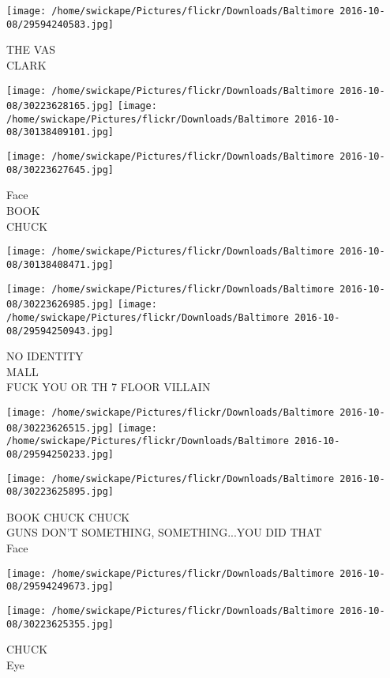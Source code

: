 \documentclass[10pt,letterpaper]{article}
\begin{document}
\vspace{0.25in}
\texttt{[image: /home/swickape/Pictures/flickr/Downloads/Baltimore 2016-10-08/29594240583.jpg]}

THE VAS\\
CLARK
\pagebreak

\texttt{[image: /home/swickape/Pictures/flickr/Downloads/Baltimore 2016-10-08/30223628165.jpg]}
\texttt{[image: /home/swickape/Pictures/flickr/Downloads/Baltimore 2016-10-08/30138409101.jpg]}

\texttt{[image: /home/swickape/Pictures/flickr/Downloads/Baltimore 2016-10-08/30223627645.jpg]}

Face\\
BOOK\\
CHUCK
\pagebreak

\texttt{[image: /home/swickape/Pictures/flickr/Downloads/Baltimore 2016-10-08/30138408471.jpg]}

\vspace{0.25in}
\texttt{[image: /home/swickape/Pictures/flickr/Downloads/Baltimore 2016-10-08/30223626985.jpg]}
\texttt{[image: /home/swickape/Pictures/flickr/Downloads/Baltimore 2016-10-08/29594250943.jpg]}

NO IDENTITY\\
MALL\\
FUCK YOU OR TH 7 FLOOR VILLAIN
\pagebreak

\texttt{[image: /home/swickape/Pictures/flickr/Downloads/Baltimore 2016-10-08/30223626515.jpg]}
\texttt{[image: /home/swickape/Pictures/flickr/Downloads/Baltimore 2016-10-08/29594250233.jpg]}

\vspace{0.25in}
\texttt{[image: /home/swickape/Pictures/flickr/Downloads/Baltimore 2016-10-08/30223625895.jpg]}

BOOK CHUCK CHUCK\\
GUNS DON'T SOMETHING, SOMETHING...YOU DID THAT\\
Face
\pagebreak

\texttt{[image: /home/swickape/Pictures/flickr/Downloads/Baltimore 2016-10-08/29594249673.jpg]}

\vspace{0.25in}
\texttt{[image: /home/swickape/Pictures/flickr/Downloads/Baltimore 2016-10-08/30223625355.jpg]}

CHUCK\\
Eye
\pagebreak
\end{document}

